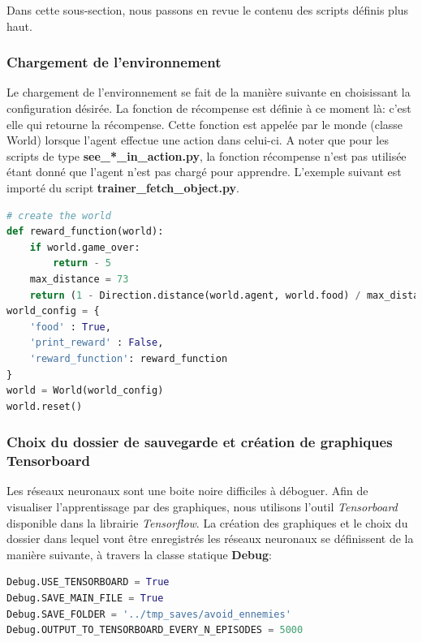 \documentclass[11pt,a4paper]{report}
\begin{document}
  \par Dans cette sous-section, nous passons en revue le contenu des scripts définis plus haut. 
  
  \subsubsection{Chargement de l'environnement}
  
  \par Le chargement de l'environnement se fait de la manière suivante en choisissant la configuration désirée. La fonction de récompense est définie à ce moment là: c'est elle qui retourne la récompense. Cette fonction est appelée par le monde (classe World) lorsque l'agent effectue une action dans celui-ci. A noter que pour les scripts de type \textbf{see\_*\_in\_action.py}, la fonction récompense n'est pas utilisée étant donné que l'agent n'est pas chargé pour apprendre. L'exemple suivant est importé du script \textbf{trainer\_fetch\_object.py}.
  
  \begin{lstlisting}[language=python]
# create the world
def reward_function(world):
    if world.game_over:
        return - 5
    max_distance = 73
    return (1 - Direction.distance(world.agent, world.food) / max_distance)
world_config = {
    'food' : True,
    'print_reward' : False,
    'reward_function': reward_function
}
world = World(world_config)
world.reset()
  \end{lstlisting}   
  
  \subsubsection{Choix du dossier de sauvegarde et création de graphiques Tensorboard}
  
  \par Les réseaux neuronaux sont une boite noire difficiles à déboguer. Afin de visualiser l'apprentissage par des graphiques, nous utilisons l'outil \textit{Tensorboard} disponible dans la librairie \textit{Tensorflow}. La création des graphiques et le choix du dossier dans lequel vont être enregistrés les réseaux neuronaux se définissent de la manière suivante, à travers la classe statique \textbf{Debug}: 
  
  \begin{lstlisting}[language=python]
Debug.USE_TENSORBOARD = True
Debug.SAVE_MAIN_FILE = True
Debug.SAVE_FOLDER = '../tmp_saves/avoid_ennemies'
Debug.OUTPUT_TO_TENSORBOARD_EVERY_N_EPISODES = 5000
  \end{lstlisting}   
  
\end{document}
